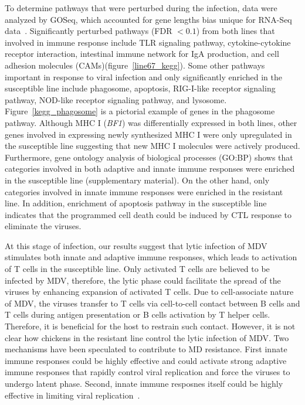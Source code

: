 \documentclass[10pt]{article}
\begin{document}
To determine pathways that were perturbed during the infection,
data were analyzed by GOSeq, which accounted for gene lengths
bias unique for RNA-Seq data~\cite{young2010method}.
Significantly perturbed pathways (FDR $< 0.1$) from both lines
that involved in immune response include TLR signaling pathway,
cytokine-cytokine receptor interaction, intestinal immune network
for IgA production, and cell adhesion molecules
(CAMs)(figure~\ref{line67_kegg}).  Some other pathways important
in response to viral infection and only significantly enriched in
the susceptible line include phagosome, apoptosis, RIG-I-like
receptor signaling pathway, NOD-like receptor signaling pathway,
and lysosome.  Figure~\ref{kegg_phagosome} is a pictorial example
of genes in the phagosome pathway.  Although MHC I ({\em BF1})
was differentially expressed in both lines, other genes involved
in expressing newly synthesized MHC I were only upregulated in
the susceptible line suggesting that new MHC I molecules were
actively produced.  Furthermore, gene ontology analysis of
biological processes (GO:BP) shows that categories involved in
both adaptive and innate immune responses were enriched in the
susceptible line (supplementary material).  On the other hand,
only categories involved in innate immune responses were enriched
in the resistant line.  In addition, enrichment of apoptosis
pathway in the susceptible line indicates that the programmed
cell death could be induced by CTL response to eliminate the
viruses.

At this stage of infection, our results suggest that lytic
infection of MDV stimulates both innate and adaptive immune
responses, which leads to activation of T cells in the
susceptible line.  Only activated T cells are believed to be
infected by MDV, therefore, the lytic phase could facilitate the
spread of the viruses by enhancing expansion of activated T
cells.  Due to cell-associate nature of MDV, the viruses transfer
to T cells via cell-to-cell contact between B cells and T cells
during antigen presentation or B cells activation by T helper
cells.  Therefore, it is beneficial for the host to restrain such
contact.  However, it is not clear how chickens in the resistant
line control the lytic infection of MDV.  Two mechanisms have
been speculated to contribute to MD resistance.  First innate
immune responses could be highly effective and could activate
strong adaptive immune responses that rapidly control viral
replication and force the viruses to undergo latent phase.
Second, innate immune resposnes itself could be highly effective
in limiting viral replication~\cite{smith2011systems}.
\end{document}
